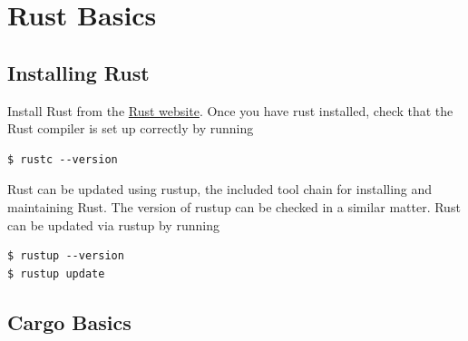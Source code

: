 \documentclass[]{article}
\begin{document}
\maketitle

\tableofcontents

\section{Rust Basics}

\subsection{Installing Rust}

Install Rust from the \href{https://www.rust-lang.org/tools/install}{Rust website}.
Once you have rust installed, check that the Rust compiler is set up correctly by running
\begin{verbatim}
$ rustc --version
\end{verbatim}
Rust can be updated using rustup, the included tool chain for installing and maintaining Rust.
The version of rustup can be checked in a similar matter.
Rust can be updated via rustup by running
\begin{verbatim}
$ rustup --version
$ rustup update
\end{verbatim}
\subsection{Cargo Basics}
\end{document}
